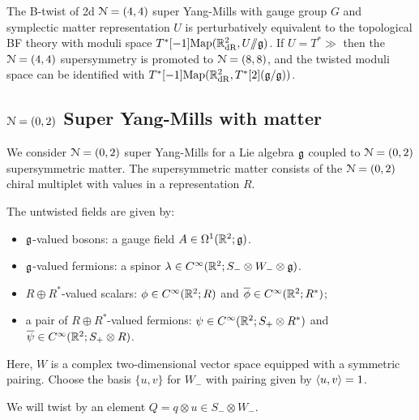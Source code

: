 \documentclass[10pt, oneside]{article}
\newcommand{\ham}{/\!\!/}
\begin{document}
\begin{theorem}
The B-twist of 2d $\mathcal{N}=(4,4)$ super Yang-Mills with gauge group $G$ and symplectic matter representation $U$ is perturbatively equivalent to the topological BF theory with moduli space $T^*[-1]\mr{Map}(\RR^2_{\mr{dR}}, U \ham \gg)$.  If $U = T^*\gg$ then the $\mathcal{N}=(4,4)$ supersymmetry is promoted to $\mathcal{N}=(8,8)$, and the twisted moduli space can be identified with $T^*[-1]\mathrm{Map}(\mathbb R^2_{\mathrm{dR}}, T^*[2](\mathfrak{g}/\mathfrak{g}))$.
\end{theorem}

\subsection{\texorpdfstring{$\mathcal N=(0,2)$}{N=(0,2)} Super Yang-Mills with matter} \label{sec:2d(0,2)}

We consider $\mathcal N=(0,2)$ super Yang-Mills for a Lie algebra $\mathfrak g$ coupled to $\mathcal N=(0,2)$ supersymmetric matter. 
The supersymmetric matter consists of the $\mathcal N = (0,2)$ chiral multiplet with values in a representation $R$. 


The untwisted fields are given by:
\begin{itemize}
\item $\mathfrak g$-valued bosons: a gauge field $A \in \Omega^1(\mathbb R^2;\mathfrak g)$.
\item $\mathfrak g$-valued fermions: a spinor $\lambda \in C^\infty(\mathbb R^2 ; S_- \otimes W_- \otimes \mathfrak g)$. 
\item $R \oplus R^*$-valued scalars: $\phi \in C^\infty(\mathbb R^2 ; R)$ and $\overline{\phi} \in C^\infty(\mathbb R^2 ; R^*)$;
\item a pair of $R \oplus R^*$-valued fermions: $\psi \in C^\infty(\mathbb R^2 ; S_+ \otimes R^*)$  and $\overline{\psi} \in C^\infty(\mathbb R^2 ; S_+ \otimes R)$.
\end{itemize}
Here, $W$ is a complex two-dimensional vector space equipped with a symmetric pairing. 
Choose the basis $\{u,v\}$ for $W_-$ with pairing given by $\langle u, v\rangle = 1$. 

We will twist by an element $Q = q \otimes u \in S_- \otimes W_-$. 
\end{document}
